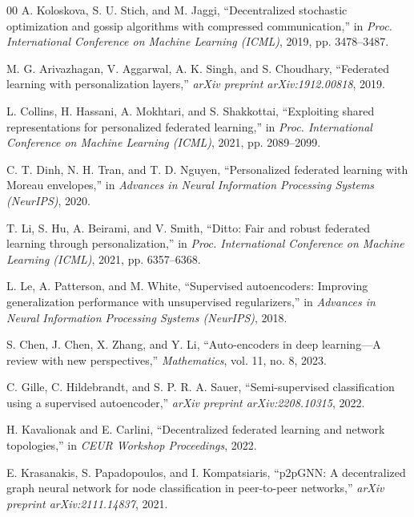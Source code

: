 \documentclass[conference]{IEEEtran}
\begin{document}
\begin{thebibliography}{00}
A. Koloskova, S. U. Stich, and M. Jaggi, ``Decentralized stochastic optimization and gossip algorithms with compressed communication,'' in \emph{Proc. International Conference on Machine Learning (ICML)}, 2019, pp. 3478--3487.

M. G. Arivazhagan, V. Aggarwal, A. K. Singh, and S. Choudhary, ``Federated learning with personalization layers,'' \emph{arXiv preprint arXiv:1912.00818}, 2019.

L. Collins, H. Hassani, A. Mokhtari, and S. Shakkottai, ``Exploiting shared representations for personalized federated learning,'' in \emph{Proc. International Conference on Machine Learning (ICML)}, 2021, pp. 2089--2099.

C. T. Dinh, N. H. Tran, and T. D. Nguyen, ``Personalized federated learning with Moreau envelopes,'' in \emph{Advances in Neural Information Processing Systems (NeurIPS)}, 2020.

T. Li, S. Hu, A. Beirami, and V. Smith, ``Ditto: Fair and robust federated learning through personalization,'' in \emph{Proc. International Conference on Machine Learning (ICML)}, 2021, pp. 6357--6368.

L. Le, A. Patterson, and M. White, ``Supervised autoencoders: Improving generalization performance with unsupervised regularizers,'' in \emph{Advances in Neural Information Processing Systems (NeurIPS)}, 2018.

S. Chen, J. Chen, X. Zhang, and Y. Li, ``Auto-encoders in deep learning---A review with new perspectives,'' \emph{Mathematics}, vol. 11, no. 8, 2023.

C. Gille, C. Hildebrandt, and S. P. R. A. Sauer, ``Semi-supervised classification using a supervised autoencoder,'' \emph{arXiv preprint arXiv:2208.10315}, 2022.

H. Kavalionak and E. Carlini, ``Decentralized federated learning and network topologies,'' in \emph{CEUR Workshop Proceedings}, 2022.

E. Krasanakis, S. Papadopoulos, and I. Kompatsiaris, ``p2pGNN: A decentralized graph neural network for node classification in peer-to-peer networks,'' \emph{arXiv preprint arXiv:2111.14837}, 2021.

\end{thebibliography}



\balance
\end{document}
